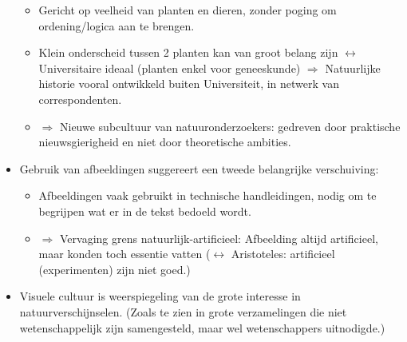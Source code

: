 \documentclass{article}
\begin{document}
\begin{itemize}
    \begin{itemize}
      \item Gericht op veelheid van planten en dieren, zonder poging om ordening/logica aan te brengen.
      \item Klein onderscheid tussen 2 planten kan van groot belang zijn $\leftrightarrow$ Universitaire ideaal (planten enkel voor geneeskunde) $\Rightarrow$ Natuurlijke historie vooral ontwikkeld buiten Universiteit, in netwerk van correspondenten.
      \item $\Rightarrow$ Nieuwe subcultuur van natuuronderzoekers: gedreven door praktische nieuwsgierigheid en niet door theoretische ambities.
    \end{itemize}
    \item Gebruik van afbeeldingen suggereert een tweede belangrijke verschuiving:
    \begin{itemize}
      \item Afbeeldingen vaak gebruikt in technische handleidingen, nodig om te begrijpen wat er in de tekst bedoeld wordt.
      \item $\Rightarrow$ Vervaging grens natuurlijk-artificieel: Afbeelding altijd artificieel, maar konden toch essentie vatten ($\leftrightarrow$ Aristoteles: artificieel (experimenten) zijn niet goed.)
    \end{itemize}
    \item Visuele cultuur is weerspiegeling van de grote interesse in natuurverschijnselen. (Zoals te zien in grote verzamelingen die niet wetenschappelijk zijn samengesteld, maar wel wetenschappers uitnodigde.)
  \end{itemize}

  \newpage
\end{document}
